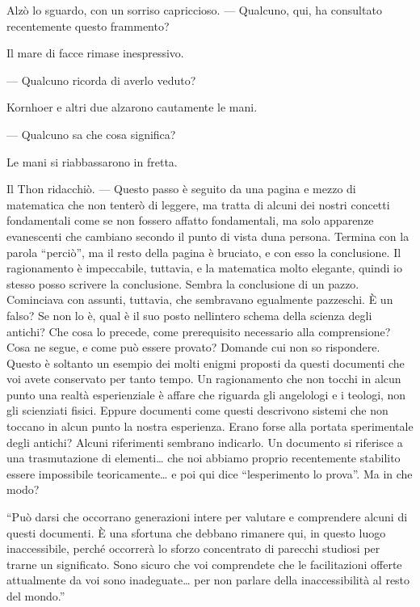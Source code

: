 Alzò lo sguardo, con un sorriso capriccioso. --- Qualcuno, qui, ha
consultato recentemente questo frammento?

Il mare di facce rimase inespressivo.

--- Qualcuno ricorda di averlo veduto?

Kornhoer e altri due alzarono cautamente le mani.

--- Qualcuno sa che cosa significa?

Le mani si riabbassarono in fretta.

Il Thon ridacchiò. --- Questo passo è seguito da una pagina e mezzo di
matematica che non tenterò di leggere, ma tratta di alcuni dei nostri
concetti fondamentali come se non fossero affatto fondamentali, ma solo
apparenze evanescenti che cambiano secondo il punto di vista
d\textquotesingle una persona. Termina con la parola ``perciò'', ma il
resto della pagina è bruciato, e con esso la conclusione. Il
ragionamento è impeccabile, tuttavia, e la matematica molto elegante,
quindi io stesso posso scrivere la conclusione. Sembra la conclusione di
un pazzo. Cominciava con assunti, tuttavia, che sembravano egualmente
pazzeschi. È un falso? Se non lo è, qual è il suo posto
nell\textquotesingle intero schema della scienza degli antichi? Che cosa
lo precede, come prerequisito necessario alla comprensione? Cosa ne
segue, e come può essere provato? Domande cui non so rispondere. Questo
è soltanto un esempio dei molti enigmi proposti da questi documenti che
voi avete conservato per tanto tempo. Un ragionamento che non tocchi in
alcun punto una realtà esperienziale è affare che riguarda gli
angelologi e i teologi, non gli scienziati fisici. Eppure documenti come
questi descrivono sistemi che non toccano in alcun punto la nostra
esperienza. Erano forse alla portata sperimentale degli antichi? Alcuni
riferimenti sembrano indicarlo. Un documento si riferisce a una
trasmutazione di elementi\ldots{} che noi abbiamo proprio recentemente
stabilito essere impossibile teoricamente\ldots{} e poi qui dice
``l\textquotesingle esperimento lo prova''. Ma in che modo?

``Può darsi che occorrano generazioni intere per valutare e comprendere
alcuni di questi documenti. È una sfortuna che debbano rimanere qui, in
questo luogo inaccessibile, perché occorrerà lo sforzo concentrato di
parecchi studiosi per trarne un significato. Sono sicuro che voi
comprendete che le facilitazioni offerte attualmente da voi sono
inadeguate\ldots{} per non parlare della inaccessibilità al resto del
mondo.''

